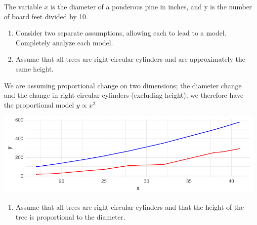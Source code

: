 \documentclass[]{article}
\newenvironment{Shaded}{\begin{snugshade}}{\end{snugshade}}
\newcommand{\KeywordTok}[1]{\textcolor[rgb]{0.13,0.29,0.53}{\textbf{{#1}}}}
\newcommand{\DataTypeTok}[1]{\textcolor[rgb]{0.13,0.29,0.53}{{#1}}}
\newcommand{\DecValTok}[1]{\textcolor[rgb]{0.00,0.00,0.81}{{#1}}}
\newcommand{\StringTok}[1]{\textcolor[rgb]{0.31,0.60,0.02}{{#1}}}
\newcommand{\NormalTok}[1]{{#1}}
\providecommand{\tightlist}{%
  \setlength{\itemsep}{0pt}\setlength{\parskip}{0pt}}
\begin{document}
The variable \(x\) is the diameter of a ponderous pine in inches, and y
is the number of board feet divided by 10.

\begin{enumerate}
\def\labelenumi{\alph{enumi}.}
\item
  Consider two separate assumptions, allowing each to lead to a model.
  Completely analyze each model.
\item
  Assume that all trees are right-circular cylinders and are
  approximately the same height.
\end{enumerate}

We are assuming proportional change on two dimensions; the diameter
change and the change in right-circular cylinders (excluding height), we
therefore have the proportional model \(y \propto x^2\)

\begin{Shaded}
\end{Shaded}

\includegraphics{CHunt_homework2_files/figure-latex/unnamed-chunk-3-1.pdf}

\newpage

\begin{enumerate}
\def\labelenumi{\roman{enumi}.}
\setcounter{enumi}{1}
\tightlist
\item
  Assume that all trees are right-circular cylinders and that the height
  of the tree is proportional to the diameter.
\end{enumerate}
\end{document}
